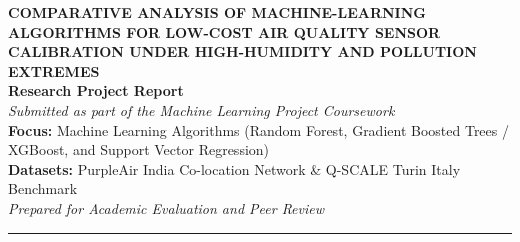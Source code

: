 \documentclass[11pt,a4paper]{article}
\begin{document}
\begin{center}
    {\LARGE \textbf{\color{blue!60!black} COMPARATIVE ANALYSIS OF MACHINE-LEARNING ALGORITHMS FOR LOW-COST AIR QUALITY SENSOR CALIBRATION UNDER HIGH-HUMIDITY AND POLLUTION EXTREMES}} \\[1.2em]
    {\large \textbf{Research Project Report}} \\[0.4em]
    {\normalsize \textit{Submitted as part of the Machine Learning Project Coursework}} \\[0.4em]
    {\small \textbf{Focus:} Machine Learning Algorithms (Random Forest, Gradient Boosted Trees / XGBoost, and Support Vector Regression)} \\[0.2em]
    {\small \textbf{Datasets:} PurpleAir India Co-location Network \& Q-SCALE Turin Italy Benchmark} \\[0.2em]
    {\small \textit{Prepared for Academic Evaluation and Peer Review}} \\[1.5em]
    \rule{\textwidth}{0.8pt}
\end{center}
\end{document}

